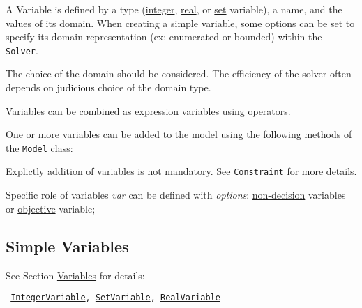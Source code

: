 A Variable is defined by a type (\hyperlink{integervariable}{integer}, \hyperlink{realvariable}{real}, or \hyperlink{setvariable}{set} variable), a name, and the values of its domain. When creating a simple variable, some options can be set to specify its domain representation (ex: enumerated or bounded) within the {\tt Solver}.
\begin{note}
The choice of the domain should be considered. The efficiency of the solver often depends on judicious choice of the domain type.
\end{note}
Variables can be combined as \hyperlink{model:expressionvariables}{expression variables} using operators.

One or more variables can be added to the model using the following methods of the \texttt{Model} class:


\begin{note}
Explictly addition of variables is not mandatory. See \hyperlink{model:constraints}{\tt Constraint} for more details.
\end{note}

Specific role of variables \emph{var} can be defined with \emph{options}:  \hyperlink{model:decisionvariables}{non-decision} variables or  \hyperlink{model:objectivevariable}{objective} variable;



\subsection{Simple Variables}\label{model:simplevariables}\hypertarget{model:simplevariables}{}
See Section \hyperlink{ch:vars}{Variables} for details:
\begin{notedef}\tt
\hyperlink{integervariable}{IntegerVariable}, \hyperlink{setvariable}{SetVariable}, \hyperlink{realvariable}{RealVariable}
\end{notedef}


